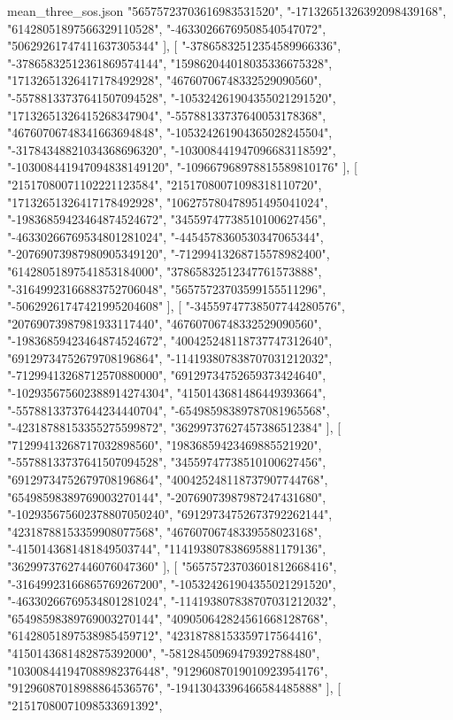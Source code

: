 \begin{filecontents*}[overwrite]{mean_three_sos.json}
    "56575723703616983531520",
    "-17132651326392098439168",
    "61428051897566329110528",
    "-46330266769508540547072",
    "50629261747411637305344"
   ],
   [
    "-37865832512354589966336",
    "-37865832512361869574144",
    "159862044018035336675328",
    "17132651326417178492928",
    "46760706748332529090560",
    "-55788133737641507094528",
    "-105324261904355021291520",
    "17132651326415268347904",
    "-55788133737640053178368",
    "46760706748341663694848",
    "-105324261904365028245504",
    "-31784348821034368696320",
    "-103008441947096683118592",
    "-103008441947094838149120",
    "-109667968978815589810176"
   ],
   [
    "21517080071102221123584",
    "21517080071098318110720",
    "17132651326417178492928",
    "106275780478951495041024",
    "-19836859423464874524672",
    "34559747738510100627456",
    "-46330266769534801281024",
    "-4454578360530347065344",
    "-20769073987980905349120",
    "-71299413268715578982400",
    "61428051897541853184000",
    "37865832512347761573888",
    "-31649923166883752706048",
    "56575723703599155511296",
    "-50629261747421995204608"
   ],
   [
    "-34559747738507744280576",
    "20769073987981933117440",
    "46760706748332529090560",
    "-19836859423464874524672",
    "400425248118737747312640",
    "69129734752679708196864",
    "-114193807838707031212032",
    "-71299413268712570880000",
    "69129734752659373424640",
    "-102935675602388914274304",
    "4150143681486449393664",
    "-55788133737644234440704",
    "-65498598389787081965568",
    "-42318788153355275599872",
    "36299737627457386512384"
   ],
   [
    "71299413268717032898560",
    "19836859423469885521920",
    "-55788133737641507094528",
    "34559747738510100627456",
    "69129734752679708196864",
    "400425248118737907744768",
    "65498598389769003270144",
    "-20769073987987247431680",
    "-102935675602378807050240",
    "69129734752673792262144",
    "42318788153359908077568",
    "46760706748339558023168",
    "-4150143681481849503744",
    "114193807838695881179136",
    "36299737627446076047360"
   ],
   [
    "56575723703601812668416",
    "-31649923166865769267200",
    "-105324261904355021291520",
    "-46330266769534801281024",
    "-114193807838707031212032",
    "65498598389769003270144",
    "409050642824561668128768",
    "61428051897538985459712",
    "42318788153359717564416",
    "4150143681482875392000",
    "-58128450969479392788480",
    "103008441947088982376448",
    "91296087019010923954176",
    "91296087018988864536576",
    "-19413043396466584485888"
   ],
   [
    "21517080071098533691392",

\end{filecontents*}
